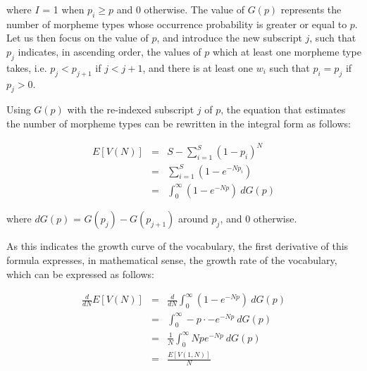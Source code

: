 \noindent
where $I$ = 1 when $p_i \geq p$ and 0 otherwise. The value of $G(p)$
represents the number of morpheme types whose occurrence probability is
greater or equal to $p$. Let us then focus on the value of $p$, and
introduce the new subscript $j$, such that $p_j$ indicates, in ascending
order, the values of $p$ which at least one morpheme type takes, i.e.
$p_j < p_{j+1}$ if $j < j+1$, and there is at least one $w_i$ such
that $p_i = p_j$ if $p_j > 0$.

Using $G(p)$ with the re-indexed subscript $j$ of $p$, the equation that
estimates the number of morpheme types can be rewritten in the integral form
as follows:

\vspace*{-\baselineskip}
 
\begin{eqnarray}
E[V(N)] & = & S - \sum_{i=1}^S(1-p_i)^N \nonumber \\
 & = & \sum_{i=1}^S(1-e^{-Np_i}) \nonumber \\
 & = & \int_{0}^\infty(1-e^{-Np}) \  dG(p) \nonumber 
\end{eqnarray}

\noindent
where $dG(p)$ = $G(p_j) - G(p_{j+1})$ around $p_j$, and 0 otherwise.

As this indicates the growth curve of the vocabulary, the first derivative
of this formula expresses, in mathematical sense, the growth rate of the
vocabulary, which can be expressed as follows:

\vspace*{-\baselineskip}
 
\begin{eqnarray}
\frac{d}{dN}E[V(N)] & = & \frac{d}{dN} \int_{0}^\infty(1-e^{-Np}) \  dG(p) \nonumber \\
 & = &  \int_{0}^\infty -p \cdot -e^{-Np} \  dG(p) \nonumber \\
 & = & \frac{1}{N} \int_{0}^\infty Npe^{-Np} \  dG(p) \nonumber \\
 & = & \frac{E[V(1,N)]}{N} \nonumber
\end{eqnarray}

\begin{biography}
\biotitle{}


\end{biography}


